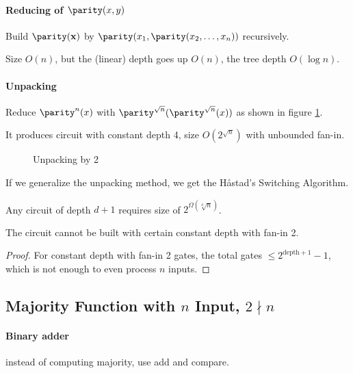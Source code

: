 \paragraph{Reducing of $\parity(x,y)$} Build $\parity(\mathbf{x})$ by $\parity(x_1, \parity(x_2, \dots, x_n))$ recursively.

Size \by \(O(n)\), but the (linear) depth goes up \by \(O(n)\), the tree depth \by \(O(\log n)\).

\paragraph{Unpacking} Reduce $\parity^n(x)$ with $\parity^{\sqrt{n}}(\parity^{\sqrt{n}}(x))$ as shown in figure \ref{fig:unpack}.

It produces circuit with constant depth 4, size \by \(O(2^{\sqrt{n}})\) with unbounded fan-in. 

\begin{figure}[ht]
    \centering
    \def\svgwidth{0.55\textwidth}
    
    \caption{Unpacking by 2}
    \label{fig:unpack}
\end{figure}

If we generalize the unpacking method, we get the H\aa{}stad's Switching Algorithm.

\begin{theorem} 
Any circuit of depth \(d+1\) requires
size of \(2^{\Omega (\sqrt[d]{n})}\).
\end{theorem}

\begin{corollary}
The circuit cannot be built with certain constant depth with fan-in 2.
\end{corollary}

\begin{proof}
For constant depth with fan-in 2 gates, the total gates \(\le 2^{\text{depth}+1}-1\), which is not enough to even process $n$ inputs.
\end{proof}

\subsection{Majority Function with \texorpdfstring{$n$}{n} Input, \texorpdfstring{\(2 \nmid n\)}{2∤n}}

\paragraph{Binary adder} instead of computing majority, use add and
  compare.

